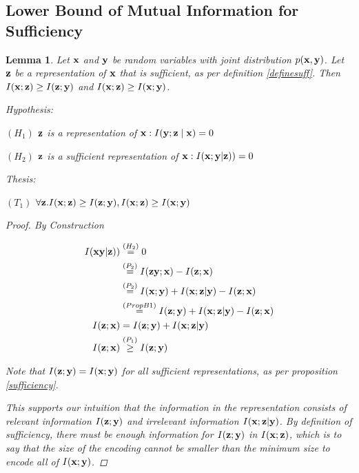 \documentclass{article} %
\theoremstyle{plain}
\newtheorem{lemma}[theorem]{Lemma}
\theoremstyle{definition}
\theoremstyle{remark}
\begin{document}

\subsection{Lower Bound of Mutual Information for Sufficiency}
\begin{lemma}
    Let ${\mathbf{x}}$ and ${\mathbf{y}}$ be random variables with joint distribution $p({\mathbf{x}}, {\mathbf{y}})$. Let ${\mathbf{z}}$ be a representation of ${\mathbf{x}}$ that is sufficient, as per definition \ref{definesuff}. Then $I({\mathbf{x}};{\mathbf{z}}) \geq I({\mathbf{z}};{\mathbf{y}})$ and $I({\mathbf{x}};{\mathbf{z}}) \geq I({\mathbf{x}};{\mathbf{y}})$. 

    Hypothesis: 

    $(H_1)$ ${\mathbf{z}}$ is a representation of ${\mathbf{x}}: I({\mathbf{y}} ; {\mathbf{z}} \mid {\mathbf{x}})=0$
    
    $(H_2)$ $ {\mathbf{z}}$ is a sufficient representation of ${\mathbf{x}}: I({\mathbf{x}}; {\mathbf{y}}| {\mathbf{z}}))=0$
    
    Thesis: 
    
    $(T_1)$ $\forall {\mathbf{z}}.I({\mathbf{x}};{\mathbf{z}}) \geq I({\mathbf{z}};{\mathbf{y}}), I({\mathbf{x}};{\mathbf{z}}) \geq I({\mathbf{x}};{\mathbf{y}})$

    \begin{proof}By Construction 

    $$
    \begin{aligned}
    I({\mathbf{x}} {\mathbf{y}}|{\mathbf{z}})) &\stackrel{\left(H_2\right)}{=} 0 \\
    &\stackrel{\left(P_2\right)}{=} I({\mathbf{z}} {\mathbf{y}}; {\mathbf{x}}) - I({\mathbf{z}}; {\mathbf{x}}) \\
    &\stackrel{\left(P_2\right)}{=} I({\mathbf{x}}; {\mathbf{y}}) + I({\mathbf{x}}; {\mathbf{z}}|{\mathbf{y}}) - I({\mathbf{z}}; {\mathbf{x}}) \\
    &\stackrel{\left(PropB1\right)}{=} I({\mathbf{z}}; {\mathbf{y}}) + I({\mathbf{x}}; {\mathbf{z}}|{\mathbf{y}}) - I({\mathbf{z}};{\mathbf{x}}) \\
    I({\mathbf{z}};{\mathbf{x}}) &= I({\mathbf{z}};{\mathbf{y}}) + I({\mathbf{x}}; {\mathbf{z}}|{\mathbf{y}})\\
   I({\mathbf{z}};{\mathbf{x}}) &\stackrel{\left(P_1\right)}{\geq} I({\mathbf{z}}; {\mathbf{y}})\\
    \end{aligned}
    $$

    Note that $I({\mathbf{z}}; {\mathbf{y}}) = I({\mathbf{x}}; {\mathbf{y}})$ for all sufficient representations, as per proposition \ref{sufficiency}.

    This supports our intuition that the information in the representation consists of relevant information $I({\mathbf{z}};{\mathbf{y}})$ and irrelevant information $I({\mathbf{x}}; {\mathbf{z}}| {\mathbf{y}})$. By definition of sufficiency, there must be enough information for $I({\mathbf{z}}; {\mathbf{y}})$ in $I({\mathbf{x}}; {\mathbf{z}})$, which is to say that the size of the encoding cannot be smaller than the minimum size to encode all of $I({\mathbf{x}}; {\mathbf{y}})$. 
    
    \end{proof} 
    \label{infobound}
\end{lemma}
\end{document}
